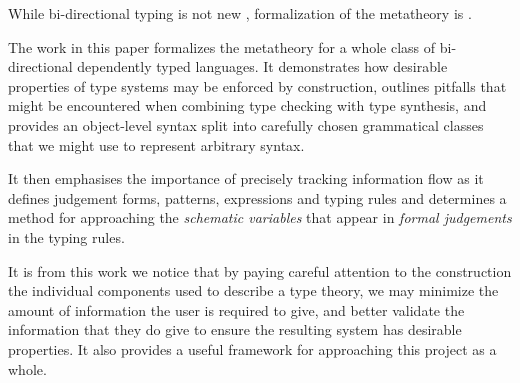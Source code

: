 While bi-directional typing is not new
\cite{DBLP:journals/toplas/PierceT00}, formalization of the metatheory
is \cite{TypesWhoSayNi}. 

The work in this paper formalizes the metatheory for a whole class of
bi-directional dependently typed languages. It demonstrates how
desirable properties of type systems may be enforced by construction,
outlines pitfalls that might be encountered when combining type
checking with type synthesis, and provides an object-level
syntax split into carefully chosen grammatical classes that we might
use to represent arbitrary syntax.

It then emphasises the importance of precisely tracking information
flow as it defines judgement forms, patterns, expressions and typing
rules and determines a method for approaching the \emph{schematic
  variables} that appear in \emph{formal judgements} in the typing
rules.

It is from this work we notice that by paying
careful attention to the construction the individual components used to
describe a type theory, we may minimize the amount of information
the user is required to give, and better validate the information that
they do give to ensure the resulting system has desirable
properties. It also provides a useful framework for approaching
this project as a whole.

